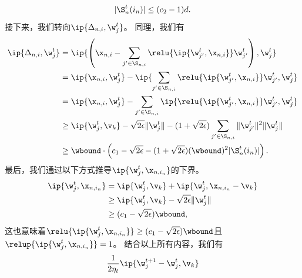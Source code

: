 \begin{myproof}
\begin{equation}
    |\S^t_n(i_n)| \leq (c_2 - 1) d.
\end{equation}
接下来，我们转向$\ip{\Delta_{n,i},\w_j^{t}}$。
同理，我们有
\begin{equation}\label{eq-theorem-phase-I-main-sum-deltani-vi}
\begin{aligned}
    \ip{\Delta_{n,i},\w_j^{t}} 
    &= \ip{ \left(\x_{n,i} - \sum_{j^{\prime} \in \S_{n,i}} \relu{\ip{\w_{j^{\prime}}^{t},\x_{n,i}}  } \w_{j^{\prime}}^{t} \right), \w_j^{t} } \\
    &= \ip{ \x_{n,i}, \w_j^{t} } - \ip{ \sum_{j^{\prime} \in \S_{n,i}} \relu{\ip{\w_{j^{\prime}}^{t},\x_{n,i}}  } \w_{j^{\prime}}^{t}, \w_j^{t} } \\
    &= \ip{ \x_{n,i}, \w_j^{t} } - \sum_{j^{\prime} \in \S_{n,i}} \ip{ \relu{\ip{\w_{j^{\prime}}^{t},\x_{n,i}}  } \w_{j^{\prime}}^{t}, \w_j^{t} } \\
    &\geq \ip{\w_j^{t}, \v_k} - \sqrt{2\epsilon} \|\w_j^t\| - (1 + \sqrt{2\epsilon})\sum_{{j^{\prime}} \in \S_{n,i}} \|\w_{j^{\prime}}^t\|^2 \|\w_{j}^t\| \\
    &\geq \wbound \cdot \left( c_1 
    - \sqrt{2\epsilon} 
    - (1 + \sqrt{2\epsilon})(\wbound)^2 |\S_n^t(i_n)| \right).
\end{aligned}
\end{equation}
最后，我们通过以下方式推导$\ip{\w_j^{t},\x_{n,i_n}}  $的下界。
\begin{equation}\label{eq-theorem-phase-I-main-lower-bound-of-ip-wj-xnin}
\begin{aligned}
\ip{\w_j^{t},\x_{n,i_n}}  
&= \ip{\w_j^{t}, \v_k} + \ip{\w_j^{t},\x_{n,i_n} - \v_k }   \\
&\geq \ip{\w_j^{t}, \v_k} - \sqrt{2\epsilon} \|\w_j^t\|   \\
&\geq (c_1 - \sqrt{2\epsilon}) \wbound,
\end{aligned}
\end{equation}
这也意味着$\relu{\ip{\w_j^{t},\x_{n,i_n}}  } \geq (c_1 - \sqrt{2\epsilon}) \wbound $且$\relup{\ip{\w_j^{t},\x_{n,i_n}}  } = 1$。
结合以上所有内容，我们有
\begin{equation}\begin{aligned}
    & \frac{1}{2\eta_t} \ip{\w^{t+1}_j - \w^{t}_j,\v_k} \\

\end{aligned}
\end{equation}
\end{myproof}

